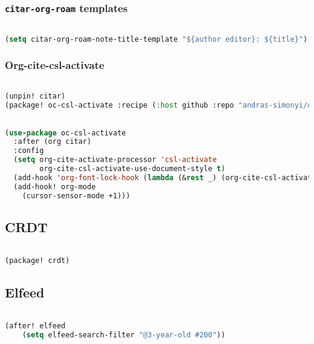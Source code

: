 \documentclass[11pt]{article}
\begin{document}
\subsubsection{\texttt{citar-org-roam} templates}
\label{sec:citar-org-roam-templates}
\begin{lstlisting}[language=Lisp]%! Someone please complete this list for me

(setq citar-org-roam-note-title-template "${author editor}: ${title}")
\end{lstlisting}

\subsubsection{Org-cite-csl-activate}
\label{sec:org-cite-csl-activate}
\begin{lstlisting}[language=Lisp]%! Someone please complete this list for me

(unpin! citar) 
(package! oc-csl-activate :recipe (:host github :repo "andras-simonyi/org-cite-csl-activate"))
\end{lstlisting}

\begin{lstlisting}[language=Lisp]%! Someone please complete this list for me

(use-package oc-csl-activate
  :after (org citar)
  :config
  (setq org-cite-activate-processor 'csl-activate
        org-cite-csl-activate-use-document-style t)
  (add-hook 'org-font-lock-hook (lambda (&rest _) (org-cite-csl-activate-render-all)))
  (add-hook! org-mode
    (cursor-sensor-mode +1)))
\end{lstlisting}


\subsection{CRDT}
\label{sec:crdt}
\begin{lstlisting}[language=Lisp]%! Someone please complete this list for me

(package! crdt)
\end{lstlisting}

\subsection{Elfeed}
\label{sec:elfeed}
\begin{lstlisting}[language=Lisp]%! Someone please complete this list for me

(after! elfeed
    (setq elfeed-search-filter "@3-year-old #200"))
\end{lstlisting}
\end{document}
